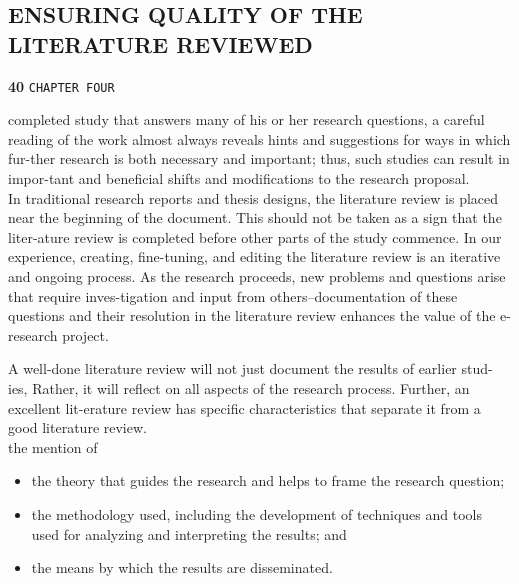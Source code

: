 \documentclass[a4,9pt]{beamer}
\begin{document}
\begin{frame}
\section*{ENSURING QUALITY OF THE LITERATURE REVIEWED}
\begin{flushleft}
\textbf{40}\hspace*{1cm} \texttt{CHAPTER FOUR}
\end{flushleft}

\vspace*{0.5cm}

completed study that answers many of his or her research questions, a careful reading of the work almost always reveals hints and suggestions for ways in which fur-ther research is both necessary and important; thus, such studies can result in impor-tant and beneficial shifts and modifications to the research proposal.\\
\hspace*{0.5cm} In traditional research reports and thesis designs, the literature review is placed near the beginning of the document. This should not be taken as a sign that the liter-ature review is completed before other parts of the study commence. In our experience, creating, fine-tuning, and editing the literature review is an iterative and ongoing process. As the research proceeds, new problems and questions arise that require inves-tigation and input from others--documentation of these questions and their resolution in the literature review enhances the value of the e-research project.\\
\end{frame}

\begin{frame}
\hspace{0.5cm} A well-done literature review will not just document the results of earlier stud-ies, Rather, it will reflect on all aspects of the research process. Further, an excellent lit-erature review has specific characteristics that separate it from a good literature review.\\
the mention of\\

\vspace*{0.2cm}
\begin{itemize}
  \item the theory that guides the research and helps to frame the research question;\\
  \item the methodology used, including the development of techniques and tools used for analyzing and interpreting the results; and\\
  \item the means by which the results are disseminated.\\
\end{itemize}

\vspace*{0.3cm}
\end{frame}
\end{document}

